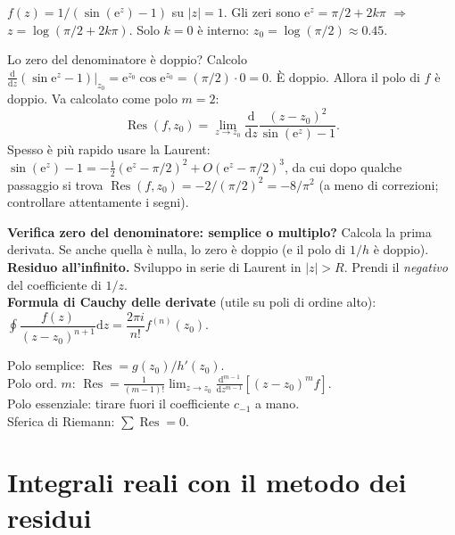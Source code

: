 \documentclass[11pt,a4paper,openany]{book}
\theoremstyle{definition}
\newcommand{\dd}{\mathrm{d}}
\newcommand{\eu}{\mathrm{e}}
\DeclareMathOperator{\Res}{Res}
\begin{document}
\begin{esempio}[Scritto 05/11/2025, Es. 1]
$f(z)=1/(\sin(\eu^z)-1)$ su $|z|=1$. Gli zeri sono $\eu^z=\pi/2+2k\pi$ $\Rightarrow$ $z=\log(\pi/2+2k\pi)$. Solo $k=0$ \`e interno: $z_0=\log(\pi/2)\approx 0.45$.

Lo zero del denominatore \`e doppio? Calcolo $\frac{\dd}{\dd z}(\sin\eu^z-1)|_{z_0}=\eu^{z_0}\cos\eu^{z_0}=(\pi/2)\cdot 0=0$. \`E doppio. Allora il polo di $f$ \`e doppio. Va calcolato come polo $m=2$:
$$\Res(f,z_0)=\lim_{z\to z_0}\frac{\dd}{\dd z}\frac{(z-z_0)^2}{\sin(\eu^z)-1}.$$
Spesso \`e pi\`u rapido usare la Laurent: $\sin(\eu^z)-1=-\tfrac 1 2(\eu^z-\pi/2)^2+O(\eu^z-\pi/2)^3$, da cui dopo qualche passaggio si trova $\Res(f,z_0)=-2/(\pi/2)^2=-8/\pi^2$ (a meno di correzioni; controllare attentamente i segni).
\end{esempio}

\begin{trucco}
\textbf{Verifica zero del denominatore: semplice o multiplo?} Calcola la prima derivata. Se anche quella \`e nulla, lo zero \`e doppio (e il polo di $1/h$ \`e doppio).\\
\textbf{Residuo all'infinito.} Sviluppo in serie di Laurent in $|z|>R$. Prendi il \emph{negativo} del coefficiente di $1/z$.\\
\textbf{Formula di Cauchy delle derivate} (utile su poli di ordine alto): $\oint\dfrac{f(z)}{(z-z_0)^{n+1}}\dd z=\dfrac{2\pi i}{n!}f^{(n)}(z_0)$.
\end{trucco}

\begin{formulario}
Polo semplice: $\Res = g(z_0)/h'(z_0)$.\\
Polo ord. $m$: $\Res = \frac{1}{(m-1)!}\lim_{z\to z_0}\frac{\dd^{m-1}}{\dd z^{m-1}}[(z-z_0)^m f]$.\\
Polo essenziale: tirare fuori il coefficiente $c_{-1}$ a mano.\\
Sferica di Riemann: $\sum\Res = 0$.
\end{formulario}

\chapter{Integrali reali con il metodo dei residui}
\end{document}
